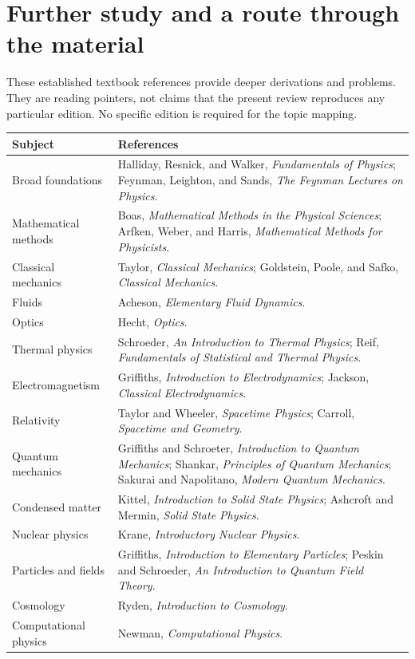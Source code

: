 \documentclass[11pt,oneside]{book}
\theoremstyle{reviewstyle}
\begin{document}
\chapter{Further study and a route through the material}
These established textbook references provide deeper derivations and problems. They are reading pointers, not claims that the present review reproduces any particular edition. No specific edition is required for the topic mapping.
\begin{longtable}{p{}p{}}
\toprule
Subject & References\\
\midrule
\endhead
Broad foundations & Halliday, Resnick, and Walker, \emph{Fundamentals of Physics}; Feynman, Leighton, and Sands, \emph{The Feynman Lectures on Physics}.\\
Mathematical methods & Boas, \emph{Mathematical Methods in the Physical Sciences}; Arfken, Weber, and Harris, \emph{Mathematical Methods for Physicists}.\\
Classical mechanics & Taylor, \emph{Classical Mechanics}; Goldstein, Poole, and Safko, \emph{Classical Mechanics}.\\
Fluids & Acheson, \emph{Elementary Fluid Dynamics}.\\
Optics & Hecht, \emph{Optics}.\\
Thermal physics & Schroeder, \emph{An Introduction to Thermal Physics}; Reif, \emph{Fundamentals of Statistical and Thermal Physics}.\\
Electromagnetism & Griffiths, \emph{Introduction to Electrodynamics}; Jackson, \emph{Classical Electrodynamics}.\\
Relativity & Taylor and Wheeler, \emph{Spacetime Physics}; Carroll, \emph{Spacetime and Geometry}.\\
Quantum mechanics & Griffiths and Schroeter, \emph{Introduction to Quantum Mechanics}; Shankar, \emph{Principles of Quantum Mechanics}; Sakurai and Napolitano, \emph{Modern Quantum Mechanics}.\\
Condensed matter & Kittel, \emph{Introduction to Solid State Physics}; Ashcroft and Mermin, \emph{Solid State Physics}.\\
Nuclear physics & Krane, \emph{Introductory Nuclear Physics}.\\
Particles and fields & Griffiths, \emph{Introduction to Elementary Particles}; Peskin and Schroeder, \emph{An Introduction to Quantum Field Theory}.\\
Cosmology & Ryden, \emph{Introduction to Cosmology}.\\
Computational physics & Newman, \emph{Computational Physics}.\\
\bottomrule
\end{longtable}
\end{document}
